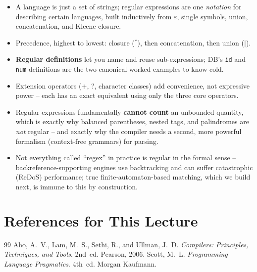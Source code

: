 \documentclass[full-course-notes.tex]{subfiles}
\begin{document}
\begin{takeaways}
\begin{itemize}
  \item A language is just a set of strings; regular expressions are one \emph{notation} for
  describing certain languages, built inductively from $\varepsilon$, single symbols, union,
  concatenation, and Kleene closure.
  \item Precedence, highest to lowest: closure ($^{*}$), then concatenation, then union
  ($\mid$).
  \item \textbf{Regular definitions} let you name and reuse sub-expressions; DB's \texttt{id}
  and \texttt{num} definitions are the two canonical worked examples to know cold.
  \item Extension operators ($+$, $?$, character classes) add convenience, not expressive power
  -- each has an exact equivalent using only the three core operators.
  \item Regular expressions fundamentally \textbf{cannot count} an unbounded quantity, which is
  exactly why balanced parentheses, nested tags, and palindromes are \emph{not} regular -- and
  exactly why the compiler needs a second, more powerful formalism (context-free grammars) for
  parsing.
  \item Not everything called ``regex'' in practice is regular in the formal sense --
  backreference-supporting engines use backtracking and can suffer catastrophic (ReDoS)
  performance; true finite-automaton-based matching, which we build next, is immune to this by
  construction.
\end{itemize}
\end{takeaways}

\section*{References for This Lecture}
\begin{thebibliography}{99}
 Aho, A.~V., Lam, M.~S., Sethi, R., and Ullman, J.~D. \textit{Compilers:
Principles, Techniques, and Tools}. 2nd~ed. Pearson, 2006.
 Scott, M.~L. \textit{Programming Language Pragmatics}. 4th~ed. Morgan
Kaufmann.
\end{thebibliography}
\end{document}
